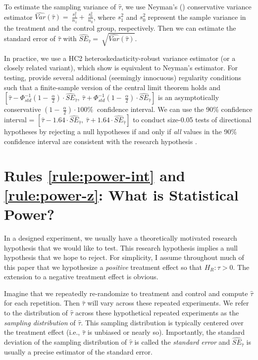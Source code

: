 \documentclass[12pt]{article}
\begin{document}
To estimate the sampling variance of $\widehat{\tau}$, we use Neyman's (\citeyear{Neyman1923}) conservative variance estimator $\widehat{Var}\left( \widehat{\tau} \right) = \ \frac{s_{1}^{2}}{n_{1}} + \ \frac{s_{0}^{2}}{n_{0}}$, where $s_{1}^{2}$ and $s_{0}^{2}$ represent the sample variance in the treatment and the control group, respectively. 
Then we can estimate the standard error of $\widehat{\tau}$ with ${\widehat{SE}}_{\widehat{\tau}} = \ \sqrt{\widehat{Var}\left( \widehat{\tau} \right)}$.

In practice, we use a HC2 heteroskedasticity-robust variance estimator (or a closely related variant), which \cite{Samii2012} show is equivalent to Neyman's estimator. 
For testing, \cite{Li2017} provide several additional (seemingly innocuous) regularity conditions such that a finite-sample version of the central limit theorem holds and $\left\lbrack \widehat{\tau} - \Phi_{std}^{- 1}\left( 1 - \ \frac{\alpha}{2} \right) \cdot {\widehat{SE}}_{\widehat{\tau}},\ \widehat{\tau} + \Phi_{std}^{- 1}\left( 1 - \ \frac{\alpha}{2} \right) \cdot {\widehat{SE}}_{\widehat{\tau}} \right\rbrack$ is an asymptotically conservative $\left( 1 - \ \frac{\alpha}{2} \right) \cdot 100\%\ $ confidence interval. 
We can use the 90\% confidence interval = $\left\lbrack \widehat{\tau} - 1.64 \cdot {\widehat{SE}}_{\widehat{\tau}},\ \widehat{\tau} + 1.64 \cdot {\widehat{SE}}_{\widehat{\tau}} \right\rbrack$ to conduct size-0.05 tests of directional hypotheses by rejecting a null hypotheses if and only if \emph{all} values in the 90\% confidence interval are consistent with the research hypothesis \citep{Rainey2014, McCaskey2015}.

\section*{Rules \ref{rule:power-int} and \ref{rule:power-z}: What is Statistical Power?}

In a designed experiment, we usually have a theoretically motivated research hypothesis that we would like to test. 
This research hypothesis implies a null hypothesis that we hope to reject. 
For simplicity, I assume throughout much of this paper that we hypothesize a \emph{positive} treatment effect so that $H_{R}:\tau > 0$. 
The extension to a negative treatment effect is obvious.

Imagine that we repeatedly re-randomize to treatment and control and compute $\widehat{\tau}$ for each repetition. 
Then $\widehat{\tau}$ will vary across these repeated experiments. 
We refer to the distribution of $\widehat{\tau}$ across these hypothetical
repeated experiments as the \emph{sampling distribution} of $\widehat{\tau}$. 
This sampling distribution is typically centered over the treatment effect (i.e., $\widehat{\tau}$ is unbiased or nearly so). 
Importantly, the standard deviation of the sampling distribution of $\widehat{\tau}$ is called the \emph{standard error} and ${\widehat{SE}}_{\widehat{\tau}}$ is usually a precise estimator of the standard error.
\end{document}
